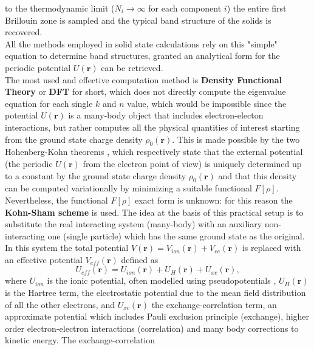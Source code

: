 to the thermodynamic limit ($N_i\to\infty$ for each component $i$) the entire first Brillouin zone is sampled and the typical band 
structure of the solids is recovered.\\
All the methods employed in solid state calculations rely on this "simple" equation to determine band structures, granted an
analytical form for the periodic potential $U(\mathbf{r})$ can be retrieved.\\
The most used and effective computation method is \textbf{Density Functional Theory} \cite{thijssen2007computational} or \textbf{DFT} 
for short, which does not directly compute the eigenvalue equation for each single $k$ and $n$ value, which would be impossible since 
the potential $U(\mathbf{r})$ is a many-body object that includes electron-electon interactions, but rather computes all the physical quantities of 
interest starting from the ground state charge density $\rho_0(\mathbf{r})$. This is made possible by the two Hohenberg-Kohn theorems \cite{hohenberg1964inhomogeneous}, 
which respectively state that the external potential (the periodic $U(\mathbf{r})$ from the electron point of view) is uniquely determined 
up to a constant by the ground state charge density $\rho_0(\mathbf{r})$ and that this density can be computed variationally by minimizing a suitable 
functional $F[\rho]$.\\
Nevertheless, the functional $F[\rho]$ exact form is unknown: for this reason the \textbf{Kohn-Sham scheme} \cite{PhysRev.140.A1133} 
is used. The idea at the basis of this practical setup is to substitute the real interacting system (many-body) with an auxiliary non-interacting
one (single particle) which has the same ground state as the original. In this system the total potential $V(\mathbf{r})=V_{ion}(\mathbf{r})+V_{ee}(\mathbf{r})$ is 
replaced with an effective potential $V_{eff}(\mathbf{r})$ defined as
\begin{equation}
    U_{eff}(\mathbf{r})=U_{ion}(\mathbf{r})+U_H(\mathbf{r})+U_{xc}(\mathbf{r}),
\end{equation}
where $U_{ion}$ is the ionic potential, often modelled using pseudopotentials \cite{kerker1980non}, $U_H(\mathbf{r})$ is the Hartree term, the electrostatic 
potential due to the mean field distribution of all the other electrons, and $U_{xc}(\mathbf{r})$ the exchange-correlation term, an approximate potential 
which includes Pauli exclusion principle (exchange), higher order electron-electron interactions (correlation) and many body corrections to kinetic energy. The exchange-correlation 
